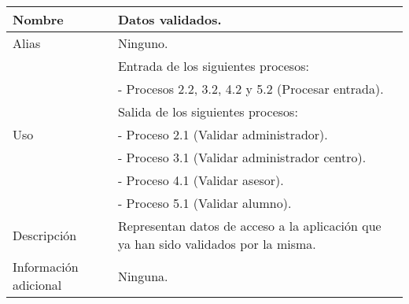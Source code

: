 \begin{center}
  \begin{tabular}{| l | p{9cm} |}
    \hline
    Nombre & \textbf{Datos validados}.\\
    \hline
    Alias & Ninguno.\\
    \hline
    \multirow{7}{*}{Uso} & Entrada de los siguientes procesos:\\
                          & - Procesos 2.2, 3.2, 4.2 y 5.2 (Procesar entrada).\\
                          & Salida de los siguientes procesos:\\
                          & - Proceso 2.1 (Validar administrador).\\
                          & - Proceso 3.1 (Validar administrador centro).\\
                          & - Proceso 4.1 (Validar asesor).\\
                          & - Proceso 5.1 (Validar alumno).\\
    \hline
    Descripción & Representan datos de acceso a la aplicación que ya han sido
                  validados por la misma.\\
    \hline
    Información adicional & Ninguna.\\
    \hline
  \end{tabular}
\end{center}
